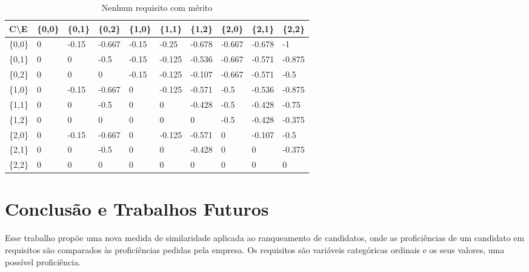 \documentclass[preprint,12pt]{elsarticle}
\begin{document}
\begin{table}[htp]
\caption{Nenhum requisito com mérito}
\label{table:merit-0-all}
\centering
\begin{tabular}{@{}llllllllll@{}}
\toprule
C\textbackslash E & \{0,0\} & \{0,1\} & \{0,2\} & \{1,0\} & \{1,1\} & \{1,2\} & \{2,0\} & \{2,1\} & \{2,2\} \\ \midrule
\{0,0\} & 0 & -0.15 & -0.667 & -0.15 & -0.25 & -0.678 & -0.667 & -0.678 & -1 \\
\{0,1\} & 0 & 0 & -0.5 & -0.15 & -0.125 & -0.536 & -0.667 & -0.571 & -0.875 \\
\{0,2\} & 0 & 0 & 0 & -0.15 & -0.125 & -0.107 & -0.667 & -0.571 & -0.5 \\
\{1,0\} & 0 & -0.15 & -0.667 & 0 & -0.125 & -0.571 & -0.5 & -0.536 & -0.875 \\
\{1,1\} & 0 & 0 & -0.5 & 0 & 0 & -0.428 & -0.5 & -0.428 & -0.75 \\
\{1,2\} & 0 & 0 & 0 & 0 & 0 & 0 & -0.5 & -0.428 & -0.375 \\
\{2,0\} & 0 & -0.15 & -0.667 & 0 & -0.125 & -0.571 & 0 & -0.107 & -0.5 \\
\{2,1\} & 0 & 0 & -0.5 & 0 & 0 & -0.428 & 0 & 0 & -0.375 \\
\{2,2\} & 0 & 0 & 0 & 0 & 0 & 0 & 0 & 0 & 0 \\ 
\bottomrule
\end{tabular}
\end{table}

\newpage

\section{Conclusão e Trabalhos Futuros}
\label{sec:sample5}

Esse trabalho propõe uma nova medida de similaridade aplicada ao ranqueamento de candidatos, onde as proficiências de um candidato em requisitos são comparados às proficiências pedidas pela empresa. Os requisitos são variáveis categóricas ordinais e os seus valores, uma possível proficiência. 
\end{document}
